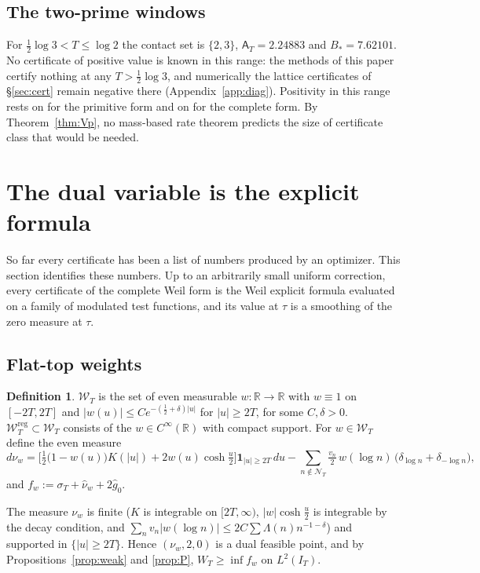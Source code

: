 \documentclass[11pt]{amsart}
\theoremstyle{definition}
\newtheorem{definition}[theorem]{Definition}
\theoremstyle{remark}
\newcommand{\R}{\mathbb R}
\newcommand{\IT}{I_T}
\newcommand{\sT}{\sigma_T}
\newcommand{\gh}[1]{\widehat g_{#1}}
\newcommand{\nuh}{\widehat\nu}
\newcommand{\Wcl}{\mathcal W_T}
\newcommand{\NT}{\mathcal N_T}
\newcommand{\Aconst}{\mathsf A_T}
\begin{document}
\subsection{The two-prime windows}\label{subsec:twoprime}
For $\frac12\log3<T\le\log2$ the contact set is $\{2,3\}$, $\Aconst=2.24883$ and $B_*=7.62101$.
No certificate of positive value is known in this range: the methods of this paper certify
nothing at any $T>\frac12\log3$, and numerically the lattice certificates of \S\ref{sec:cert}
remain negative there (Appendix~\ref{app:diag}). Positivity in this range rests on \cite{Paper42}
for the primitive form and on \cite[Thm.~1.2]{Zhu2026} for the complete form. By
Theorem~\ref{thm:Vp}, no mass-based rate theorem predicts the size of certificate class that would
be needed.


\section{The dual variable is the explicit formula}\label{sec:Z}

So far every certificate has been a list of numbers produced by an optimizer. This section
identifies these numbers. Up to an arbitrarily small uniform correction, every certificate of the
complete Weil form is the Weil explicit formula evaluated on a family of modulated test functions,
and its value at $\tau$ is a smoothing of the zero measure at $\tau$.

\subsection{Flat-top weights}
\begin{definition}\label{def:W}
$\Wcl$ is the set of even measurable $w:\R\to\R$ with $w\equiv1$ on $[-2T,2T]$ and
$|w(u)|\le Ce^{-(\frac12+\delta)|u|}$ for $|u|\ge2T$, for some $C,\delta>0$. $\Wcl^{\mathrm{reg}}\subset\Wcl$
consists of the $w\in C^\infty(\R)$ with compact support. For $w\in\Wcl$ define the even measure
\begin{equation}\label{eq:nuw}
d\nu_w=\Big[\tfrac12\big(1-w(u)\big)K(|u|)+2w(u)\cosh\tfrac u2\Big]\mathbf 1_{|u|\ge2T}\,du
-\sum_{n\notin\NT}\tfrac{v_n}2\,w(\log n)\,\big(\delta_{\log n}+\delta_{-\log n}\big),
\end{equation}
and $f_w:=\sT+\nuh_w+2\gh0$.
\end{definition}
The measure $\nu_w$ is finite ($K$ is integrable on $[2T,\infty)$, $|w|\cosh\frac u2$ is
integrable by the decay condition, and $\sum_nv_n|w(\log n)|\le2C\sum\Lambda(n)n^{-1-\delta}$) and
supported in $\{|u|\ge2T\}$. Hence $(\nu_w,2,0)$ is a dual feasible point, and by
Propositions~\ref{prop:weak} and \ref{prop:P}, $W_T\ge\inf f_w$ on $L^2(\IT)$.
\end{document}
